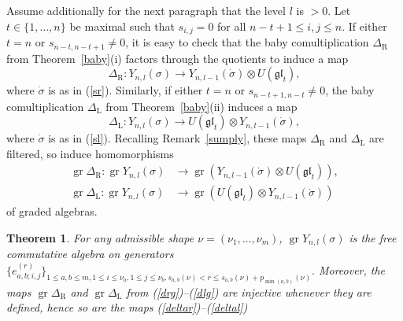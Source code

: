 \documentclass[twoside,12pt,reqno]{amsart}
\newtheorem{Theorem}[Proposition]{Theorem}
\def\rt{{\operatorname{\scriptscriptstyle R}}}
\def\lt{{\operatorname{\scriptscriptstyle L}}}
\def\gr{\operatorname{gr}}
\begin{document}
Assume additionally for the next paragraph that the level $l$ is
$> 0$.
Let $t \in \{1,\dots,n\}$ be maximal such that
$s_{i,j}=0$ for all $n-t+1 \leq i,j \leq n$.
If either $t = n$ or 
$s_{n-t,n-t+1} \neq 0$,
it is easy to check that the 
baby comultiplication $\Delta_{\rt}$
from Theorem~\ref{baby}(i) factors through the quotients to
induce a map
\begin{equation}\label{deltar}
\Delta_{\rt}:Y_{n,l}(\sigma) 
\rightarrow Y_{n,l-1}(\dot\sigma) \otimes 
U(\mathfrak{gl}_t),
\end{equation}
where $\dot\sigma$ is as in (\ref{sr}).
Similarly, if either $t = n$ or $s_{n-t+1,n-t} \neq 0$,
the baby comultiplication $\Delta_{\lt}$
from Theorem~\ref{baby}(ii) induces a map
\begin{equation}\label{deltal}
\Delta_{\lt}:Y_{n,l}(\sigma) \rightarrow U(\mathfrak{gl}_t) \otimes
Y_{n,l-1}(\dot\sigma),
\end{equation}
where $\dot\sigma$ is as in (\ref{sl}).
Recalling Remark~\ref{sumply}, these maps
$\Delta_{\rt}$ and $\Delta_{\lt}$ are filtered,
so induce homomorphisms
\begin{align}\label{drg}
\gr \Delta_{\rt}:\gr Y_{n,l}(\sigma) &\rightarrow \gr 
(Y_{n,l-1}(\dot\sigma) \otimes 
U(\mathfrak{gl}_t)),\\
\gr \Delta_{\lt}:\gr Y_{n,l}(\sigma) &\rightarrow \gr 
(U(\mathfrak{gl}_t) \otimes Y_{n,l-1}(\dot\sigma))\label{dlg}
\end{align}
of graded algebras.

\begin{Theorem}\label{miuramain}
For any admissible shape $\nu = (\nu_1,\dots,\nu_m)$,
$\gr Y_{n,l}(\sigma)$ is the free commutative algebra
on generators
$\{e_{a,b;i,j}^{(r)}\}_{1 \leq a,b \leq m,
1 \leq i \leq \nu_a, 1 \leq j \leq \nu_b, s_{a,b}(\nu)
< r \leq s_{a,b}(\nu) + p_{\min(a,b)}(\nu)}.$
Moreover, the maps $\gr \Delta_{\rt}$ and $\gr\Delta_{\lt}$ from 
(\ref{drg})--(\ref{dlg})
are injective whenever they are defined,
hence so are the maps (\ref{deltar})--(\ref{deltal})
\end{Theorem}
\end{document}
